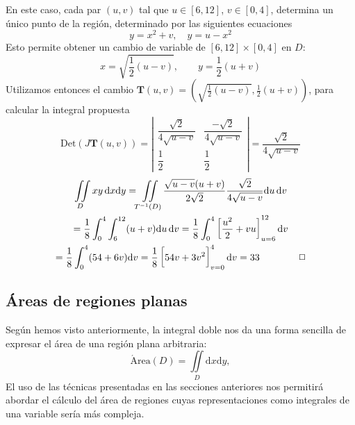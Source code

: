 \begin{ejemplo}
En este caso, cada par $(u,v)$ tal que $u\in[6,12]$, $v\in[0,4]$, determina un único punto de la región, determinado por las siguientes ecuaciones
\[
y=x^2+v,\quad  y=u-x^2
\]
Esto permite obtener un cambio de variable de $[6,12]\times [0,4]$ en $D$:
\[
x=\sqrt{\frac12(u-v)},\qquad y=\frac12(u+v)
\]
Utilizamos entonces el cambio $\boldsymbol{T}(u,v)=(\sqrt{\frac12(u-v)},\frac12(u+v))$, para calcular la integral propuesta
\[
\mathrm{Det}(J\boldsymbol{T}(u,v))=\left|\begin{matrix}
\dfrac{\sqrt2}{4\sqrt{u-v}} & \dfrac{-\sqrt2}{4\sqrt{u-v}} \\
\dfrac12 & \dfrac12
\end{matrix}\right| = \dfrac{\sqrt2}{4\sqrt{u-v}}
\]
\begin{multline*}
\iint\limits_{D} xy\,\mathrm dx\mathrm dy =
\iint\limits_{T^{-1}(D)} \dfrac{\sqrt{u-v}(u+v)}{2\sqrt2}\dfrac{\sqrt2}{4\sqrt{u-v}}\mathrm du\,\mathrm dv\\ =
\dfrac{1}{8}\int_0^4\int_6^{12}(u+v)\mathrm du\,\mathrm dv
=\dfrac18\int_0^4\left[\dfrac{u^2}{2}+vu\right]_{u=6}^{12}\mathrm dv\\
=\dfrac18\int_0^4(54+6v)\mathrm dv
=\dfrac18\left[54v+3v^2\vphantom{\dfrac12}\right]_{v=0}^{4}\mathrm dv 
= 33\tag*{\fej}
\end{multline*}
\end{ejemplo}



\subsection{Áreas de regiones planas}

Según hemos visto anteriormente, la integral doble nos da una forma sencilla de expresar el área de una región plana arbitraria:
\[
\mathrm{\acute{A}rea}(\mathit D)=\iint\limits_{\mathit D} \mathrm dx\mathrm dy,
\]
El uso de las técnicas presentadas en las secciones anteriores nos permitirá abordar el cálculo del área de regiones cuyas representaciones como integrales de una variable sería más compleja.

